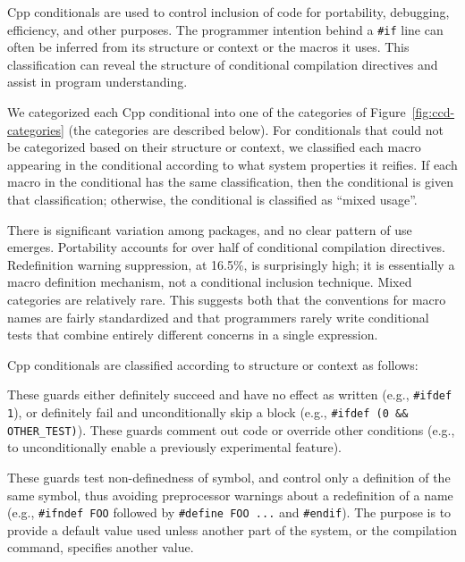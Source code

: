 \documentclass[10pt]{article}
\begin{document}
Cpp conditionals are used to control inclusion of code for portability,
debugging, efficiency, and other purposes.  The programmer intention behind
a {\tt \#if} line can often be inferred from its structure or context or
the macros it uses.  This classification can reveal the structure of
conditional compilation directives and assist in program understanding.

We categorized each Cpp conditional into one of the categories of
Figure~\ref{fig:ccd-categories} (the categories are described below).  For
conditionals that could not be categorized based on their structure or
context, we classified each macro appearing in the conditional according to
what system properties it reifies.  If each macro in the conditional has the
same classification, then the conditional is given that classification;
otherwise, the conditional is classified as ``mixed usage''.

There is significant variation among packages, and no clear pattern of use
emerges.  Portability accounts for over half of conditional compilation
directives.  Redefinition warning suppression, at 16.5\%, is surprisingly
high; it is essentially a macro definition mechanism, not a conditional
inclusion technique.  Mixed categories are relatively rare.  This suggests
both that the conventions for macro names are fairly standardized and that
programmers rarely write conditional tests that combine entirely different
concerns in a single expression.


Cpp conditionals are classified according to structure or context as follows:
\begin{description}\itemsep 0pt \parskip 0pt
\item[Commenting] These guards either definitely succeed and
  have no effect as written (e.g., \texttt{\#ifdef 1}), or definitely fail
  and unconditionally skip a block (e.g., {\tt \#ifdef (0 \&\&
  \verb|OTHER_TEST|)}).  These guards comment out code or override other
  conditions (e.g., to unconditionally enable a previously experimental
  feature).
      
\item[Redefinition suppression] These guards test non-definedness of
  symbol, and control only a definition of the same symbol, thus avoiding
  preprocessor warnings about a redefinition of a name (e.g.,
  \texttt{\#ifndef FOO} followed by \texttt{\#define FOO ...} and
  \texttt{\#endif}).  
  The purpose is to provide a default value used unless another part of the
  system, or the compilation command, specifies another value.

\end{description}
\end{document}
